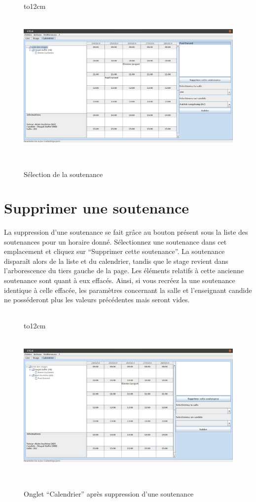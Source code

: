 \documentclass[a4paper,10pt]{report}
\begin{document}
	 \begin{figure}[H]
	   \hbox to12cm{\hss\includegraphics[height=8cm,width=18cm]{../general/soutenance.png}\hss}
	   \caption{Sélection de la soutenance}
	 \end{figure}
      
      
      \newpage
    \section{Supprimer une soutenance}
      \paragraph{}
	La suppression d'une soutenance se fait grâce au bouton présent sous la liste des soutenances pour un horaire donné.
	Sélectionnez une soutenance dans cet emplacement et cliquez sur ``Supprimer cette soutenance''.
	La soutenance disparaît alors de la liste et du calendrier, tandis que le stage revient dans l'arborescence du tiers gauche de la page.
	Les éléments relatifs à cette ancienne soutenance sont quant à eux effacés.
	Ainsi, si vous recréez la une soutenance identique à celle effacée, les paramètres concernant la salle et l'enseignant candide ne posséderont plus les valeurs précédentes mais seront vides.
	~\\~\\
	\begin{figure}[H]
	   \hbox to12cm{\hss\includegraphics[height=8cm,width=18cm]{../general/suppression.png}\hss}
	   \caption{Onglet ``Calendrier'' après suppression d'une soutenance}
	 \end{figure}
	
\end{document}
